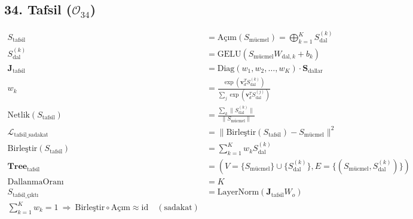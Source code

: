 \documentclass[11pt, a4paper]{article}
\begin{document}
\subsection{34. Tafsil ($\mathcal{O}_{34}$)}
\begin{align}
S_{\text{tafsil}} &= \text{Açım}(S_{\text{mücmel}}) = \bigoplus_{k=1}^K S_{\text{dal}}^{(k)} \\
S_{\text{dal}}^{(k)} &= \text{GELU}(S_{\text{mücmel}} W_{\text{dal}, k} + b_k) \\
\mathbf{J}_{\text{tafsil}} &= \text{Diag}(w_1, w_2, \dots, w_K) \cdot \mathbf{S}_{\text{dallar}} \\
w_k &= \frac{\exp(\mathbf{v}_d^T S_{\text{dal}}^{(k)})}{\sum_j \exp(\mathbf{v}_d^T S_{\text{dal}}^{(j)})} \\
\text{Netlik}(S_{\text{tafsil}}) &= \frac{\sum_k \|S_{\text{dal}}^{(k)}\|}{\|S_{\text{mücmel}}\|} \\
\mathcal{L}_{\text{tafsil\_sadakat}} &= \| \text{Birleştir}(S_{\text{tafsil}}) - S_{\text{mücmel}} \|^2 \\
\text{Birleştir}(S_{\text{tafsil}}) &= \sum_{k=1}^K w_k S_{\text{dal}}^{(k)} \\
\mathbf{Tree}_{\text{tafsil}} &= \left( V=\{S_{\text{mücmel}}\} \cup \{S_{\text{dal}}^{(k)}\}, E=\{(S_{\text{mücmel}}, S_{\text{dal}}^{(k)})\}\right) \\
\text{DallanmaOranı} &= K \\
S_{\text{tafsil\_çıktı}} &= \text{LayerNorm}(\mathbf{J}_{\text{tafsil}} W_o) \\
\sum_{k=1}^K w_k = 1 \ \Rightarrow \ \text{Birleştir} \circ \text{Açım} \approx \mathrm{id} \quad (\text{sadakat})
\end{align}
\end{document}
